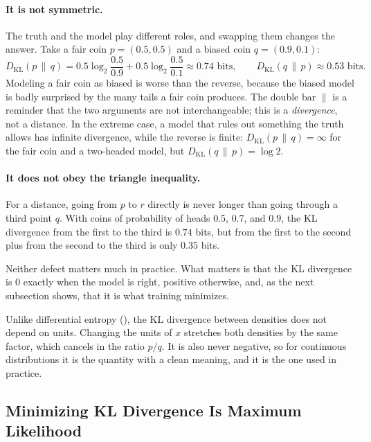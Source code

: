 \paragraph{It is not symmetric.}
The truth and the model play different roles, and swapping them changes
the answer. Take a fair coin $p = (0.5, 0.5)$ and a biased coin $q = (0.9,
0.1)$:
\[
  D_{\mathrm{KL}}(p \,\|\, q)
  = 0.5 \log_2 \frac{0.5}{0.9} + 0.5 \log_2 \frac{0.5}{0.1}
  \approx 0.74 \text{ bits},
  \qquad
  D_{\mathrm{KL}}(q \,\|\, p) \approx 0.53 \text{ bits}.
\]
Modeling a fair coin as biased is worse than the reverse, because the
biased model is badly surprised by the many tails a fair coin produces.
The double bar $\|$ is a reminder that the two arguments are not
interchangeable; this is a \emph{divergence}, not a distance. In the
extreme case, a model that rules out something the truth allows has
infinite divergence, while the reverse is finite: $D_{\mathrm{KL}}(p \,\|\,
q) = \infty$ for the fair coin and a two-headed model, but
$D_{\mathrm{KL}}(q \,\|\, p) = \log 2$.

\paragraph{It does not obey the triangle inequality.}
For a distance, going from $p$ to $r$ directly is never longer than going
through a third point $q$. With coins of probability of heads $0.5$,
$0.7$, and $0.9$, the KL divergence from the first to the third is
$0.74$ bits, but from the first to the second plus from the second to the
third is only $0.35$ bits.

Neither defect matters much in practice. What matters is that the KL
divergence is $0$ exactly when the model is right, positive otherwise,
and, as the next subsection shows, that it is what training minimizes.

Unlike differential entropy (), the KL
divergence between densities does not depend on units. Changing the
units of $x$ stretches both densities by the same factor, which cancels
in the ratio $p/q$. It is also never negative, so for continuous
distributions it is the quantity with a clean meaning, and it is the one
used in practice.

\subsection{Minimizing KL Divergence Is Maximum Likelihood}
\label{sec:ch07-kl-mle}

